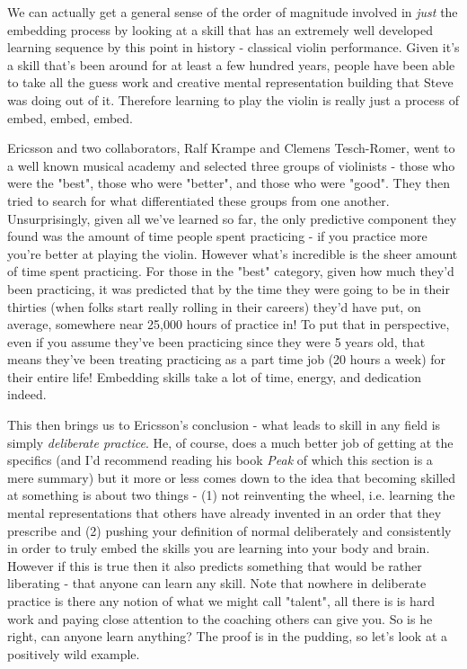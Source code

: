 \documentclass[11pt,a5paper]{book}
\begin{document}
We can actually get a general sense of the order of magnitude involved in \textit{just} the embedding process by looking at a skill that has an extremely well developed learning sequence by this point in history - classical violin performance. Given it's a skill that's been around for at least a few hundred years, people have been able to take all the guess work and creative mental representation building that Steve was doing out of it. Therefore learning to play the violin is really just a process of embed, embed, embed. 
\newline

Ericsson and two collaborators, Ralf Krampe and Clemens Tesch-Romer, went to a well known musical academy and selected three groups of violinists - those who were the "best", those who were "better", and those who were "good". They then tried to search for what differentiated these groups from one another. Unsurprisingly, given all we've learned so far, the only predictive component they found was the amount of time people spent practicing - if you practice more you're better at playing the violin. However what's incredible is the sheer amount of time spent practicing. For those in the "best" category, given how much they'd been practicing, it was predicted that by the time they were going to be in their thirties (when folks start really rolling in their careers) they'd have put, on average, somewhere near 25,000 hours of practice in! To put that in perspective, even if you assume they've been practicing since they were 5 years old, that means they've been treating practicing as a part time job (20 hours a week) for their entire life! Embedding skills take a lot of time, energy, and dedication indeed.
\newline

This then brings us to Ericsson's conclusion - what leads to skill in any field is simply \textit{deliberate practice}. He, of course, does a much better job of getting at the specifics (and I'd recommend reading his book \textit{Peak} \cite{ericsson} of which this section is a mere summary) but it more or less comes down to the idea that becoming skilled at something is about two things - (1) not reinventing the wheel, i.e. learning the mental representations that others have already invented in an order that they prescribe and (2) pushing your definition of normal deliberately and consistently in order to truly embed the skills you are learning into your body and brain. However if this is true then it also predicts something that would be rather liberating - that anyone can learn any skill. Note that nowhere in deliberate practice is there any notion of what we might call "talent", all there is is hard work and paying close attention to the coaching others can give you. So is he right, can anyone learn anything? The proof is in the pudding, so let's look at a positively wild example.
\newline
\end{document}
